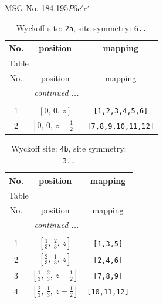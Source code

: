 \documentclass[fleqn,8pt]{jsarticle}
\begin{document}
\setcounter{MaxMatrixCols}{32}

\renewcommand{\tablename}{Table~}
\renewcommand{\figurename}{Figure~}
\begin{center}
\LARGE
MSG No. 184.195\quad$P6c'c'$
\end{center}
\renewcommand{\arraystretch}{1.2}
\begin{longtable}{ccc}
\caption{Wyckoff site: {\tt 2a}, site symmetry: {\tt 6..}}
 \\
 \hline \hline
No. & position & mapping \\ \hline \endfirsthead

\multicolumn{2}{l}{\tablename\ \thetable{}} \\
 \hline \hline
No. & position & mapping \\ \hline \endhead

 \hline \hline
\multicolumn{2}{r}{\footnotesize\it continued ...} \\ \endfoot

 \hline \hline
\multicolumn{2}{r}{} \\ \endlastfoot

1 & $\left[ 0,\, 0,\, z \right]$ & {\tt [1,2,3,4,5,6]} \\ \hline
2 & $\left[ 0,\, 0,\, z + \frac{1}{2} \right]$ & {\tt [7,8,9,10,11,12]} \\
\end{longtable}
\renewcommand{\arraystretch}{1.2}
\begin{longtable}{ccc}
\caption{Wyckoff site: {\tt 4b}, site symmetry: {\tt 3..}}
 \\
 \hline \hline
No. & position & mapping \\ \hline \endfirsthead

\multicolumn{2}{l}{\tablename\ \thetable{}} \\
 \hline \hline
No. & position & mapping \\ \hline \endhead

 \hline \hline
\multicolumn{2}{r}{\footnotesize\it continued ...} \\ \endfoot

 \hline \hline
\multicolumn{2}{r}{} \\ \endlastfoot

1 & $\left[ \frac{1}{3},\, \frac{2}{3},\, z \right]$ & {\tt [1,3,5]} \\ \hline
2 & $\left[ \frac{2}{3},\, \frac{1}{3},\, z \right]$ & {\tt [2,4,6]} \\ \hline
3 & $\left[ \frac{1}{3},\, \frac{2}{3},\, z + \frac{1}{2} \right]$ & {\tt [7,8,9]} \\ \hline
4 & $\left[ \frac{2}{3},\, \frac{1}{3},\, z + \frac{1}{2} \right]$ & {\tt [10,11,12]} \\
\end{longtable}
\end{document}

